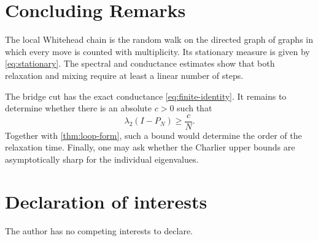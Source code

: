 \documentclass[11pt]{article}
\theoremstyle{plain}
\theoremstyle{definition}
\numberwithin{equation}{section}
\begin{document}
\section{Concluding Remarks}

The local Whitehead chain is the random walk on the directed graph of graphs
in which every move is counted with multiplicity.  Its stationary measure is
given by \eqref{eq:stationary}.  The spectral and conductance estimates show
that both relaxation and mixing require at least a linear number of steps.

The bridge cut has the exact conductance \eqref{eq:finite-identity}.
It remains to determine whether there is an absolute
$c>0$ such that
\[
  \lambda_2(I-P_N)\geq \frac{c}{N}.
\]
Together with \cref{thm:loop-form}, such a bound would determine the
order of the relaxation time.  Finally, one may ask whether the Charlier
upper bounds are asymptotically sharp for the individual eigenvalues.

\section*{Declaration of interests}

The author has no competing interests to declare.



\end{document}
